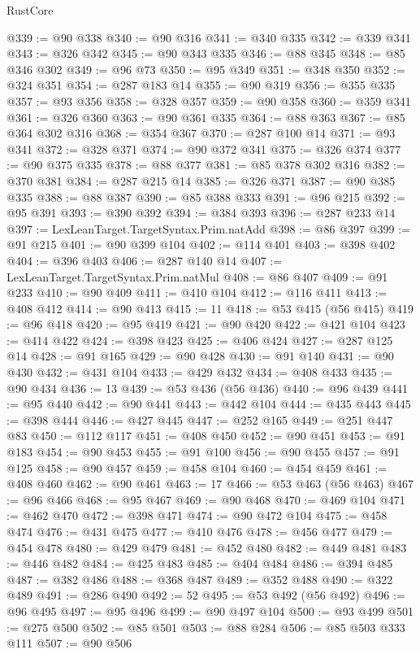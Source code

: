 \begin{lexlean}{RustCore}
\begin{coremodule}
@339 := @90 @338
@340 := @90 @316
@341 := @340 @335
@342 := @339 @341
@343 := @326 @342
@345 := @90 @343 @335
@346 := @88 @345
@348 := @85 @346 @302
@349 := @96 @73
@350 := @95 @349
@351 := @348 @350
@352 := @324 @351
@354 := @287 @183 @14
@355 := @90 @319
@356 := @355 @335
@357 := @93 @356
@358 := @328 @357
@359 := @90 @358
@360 := @359 @341
@361 := @326 @360
@363 := @90 @361 @335
@364 := @88 @363
@367 := @85 @364 @302 @316
@368 := @354 @367
@370 := @287 @100 @14
@371 := @93 @341
@372 := @328 @371
@374 := @90 @372 @341
@375 := @326 @374
@377 := @90 @375 @335
@378 := @88 @377
@381 := @85 @378 @302 @316
@382 := @370 @381
@384 := @287 @215 @14
@385 := @326 @371
@387 := @90 @385 @335
@388 := @88 @387
@390 := @85 @388 @333
@391 := @96 @215
@392 := @95 @391
@393 := @390 @392
@394 := @384 @393
@396 := @287 @233 @14
@397 := LexLeanTarget.TargetSyntax.Prim.natAdd
@398 := @86 @397
@399 := @91 @215
@401 := @90 @399 @104
@402 := @114 @401
@403 := @398 @402
@404 := @396 @403
@406 := @287 @140 @14
@407 := LexLeanTarget.TargetSyntax.Prim.natMul
@408 := @86 @407
@409 := @91 @233
@410 := @90 @409
@411 := @410 @104
@412 := @116 @411
@413 := @408 @412
@414 := @90 @413
@415 := 11
@418 := @53 @415 (@56 @415)
@419 := @96 @418
@420 := @95 @419
@421 := @90 @420
@422 := @421 @104
@423 := @414 @422
@424 := @398 @423
@425 := @406 @424
@427 := @287 @125 @14
@428 := @91 @165
@429 := @90 @428
@430 := @91 @140
@431 := @90 @430
@432 := @431 @104
@433 := @429 @432
@434 := @408 @433
@435 := @90 @434
@436 := 13
@439 := @53 @436 (@56 @436)
@440 := @96 @439
@441 := @95 @440
@442 := @90 @441
@443 := @442 @104
@444 := @435 @443
@445 := @398 @444
@446 := @427 @445
@447 := @252 @165
@449 := @251 @447 @83
@450 := @112 @117
@451 := @408 @450
@452 := @90 @451
@453 := @91 @183
@454 := @90 @453
@455 := @91 @100
@456 := @90 @455
@457 := @91 @125
@458 := @90 @457
@459 := @458 @104
@460 := @454 @459
@461 := @408 @460
@462 := @90 @461
@463 := 17
@466 := @53 @463 (@56 @463)
@467 := @96 @466
@468 := @95 @467
@469 := @90 @468
@470 := @469 @104
@471 := @462 @470
@472 := @398 @471
@474 := @90 @472 @104
@475 := @458 @474
@476 := @431 @475
@477 := @410 @476
@478 := @456 @477
@479 := @454 @478
@480 := @429 @479
@481 := @452 @480
@482 := @449 @481
@483 := @446 @482
@484 := @425 @483
@485 := @404 @484
@486 := @394 @485
@487 := @382 @486
@488 := @368 @487
@489 := @352 @488
@490 := @322 @489
@491 := @286 @490
@492 := 52
@495 := @53 @492 (@56 @492)
@496 := @96 @495
@497 := @95 @496
@499 := @90 @497 @104
@500 := @93 @499
@501 := @275 @500
@502 := @85 @501
@503 := @88 @284
@506 := @85 @503 @333 @111
@507 := @90 @506

\end{coremodule}
\end{lexlean}
